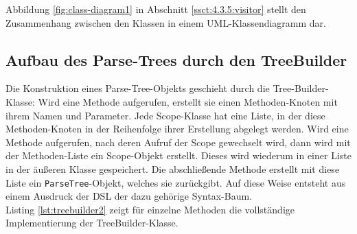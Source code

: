 \noindent
Abbildung \ref{fig:class-diagram1} in Abschnitt \ref{ssct:4.3.5:visitor} stellt den Zusammenhang zwischen den Klassen in einem UML-Klassendiagramm dar.

\subsection{Aufbau des Parse-Trees durch den TreeBuilder}\label{ssct:4.3.4:aufbau}
Die Konstruktion eines Parse-Tree-Objekts geschieht durch die Tree-Builder-Klasse: Wird eine Methode aufgerufen, erstellt sie einen Methoden-Knoten mit ihrem Namen und Parameter. Jede Scope-Klasse hat eine Liste, in der diese Methoden-Knoten in der Reihenfolge ihrer Erstellung abgelegt werden. Wird eine Methode aufgerufen, nach deren Aufruf der Scope gewechselt wird, dann wird mit der Methoden-Liste ein Scope-Objekt erstellt. Dieses wird wiederum in einer Liste in der äußeren Klasse gespeichert. Die abschließende Methode erstellt mit diese Liste ein \texttt{ParseTree}-Objekt, welches sie zurückgibt. Auf diese Weise entsteht aus einem Ausdruck der DSL der dazu gehörige Syntax-Baum.\\
Listing \ref{lst:treebuilder2} zeigt für einzelne Methoden die vollständige Implementierung der TreeBuilder-Klasse.\\

